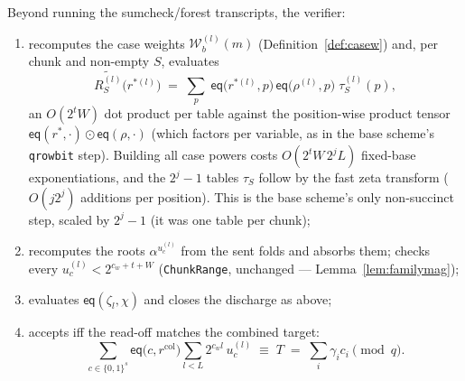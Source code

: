 \documentclass[11pt]{article}
\newcommand{\bits}{\{0,1\}}
\newcommand{\mle}[1]{\widetilde{#1}}
\newcommand{\eq}{\mathsf{eq}}
\newcommand{\cw}{c_w}
\newcommand{\Wc}{\mathcal{W}}          %
\DeclareRobustCommand{\code}[1]{{\def\_{\textunderscore\allowbreak}\texttt{#1}}}
\theoremstyle{plain}
\theoremstyle{definition}
\theoremstyle{remark}
\begin{document}
Beyond running the sumcheck/forest transcripts, the verifier:
\begin{enumerate}[leftmargin=1.8em,itemsep=1pt]
\item recomputes the case weights $\Wc^{(l)}_b(m)$ (Definition~\ref{def:casew})
  and, per chunk and non-empty $S$, evaluates
  \[
    \mle{R^{(l)}_S}\bigl(r^{*(l)}\bigr)
    \;=\; \sum_{p}\;\eq\bigl(r^{*(l)},p\bigr)\,\eq\bigl(\rho^{(l)},p\bigr)\;
          \tau^{(l)}_S(p),
  \]
  an $O(2^{t}W)$ dot product per table against the position-wise product
  tensor $\eq(r^{*},\cdot)\odot\eq(\rho,\cdot)$ (which factors per variable,
  as in the base scheme's \code{q\_rowbit} step). Building all case powers
  costs $O(2^{t}W\,2^{j}L)$ fixed-base exponentiations, and the
  $2^{j}-1$ tables $\tau_S$ follow by the fast zeta transform
  ($O(j2^{j})$ additions per position). This is the base scheme's only
  non-succinct step, scaled by $2^{j}-1$ (it was one table per chunk);
\item recomputes the roots $\alpha^{u^{(l)}_c}$ from the sent folds and
  absorbs them; checks every $u^{(l)}_c < 2^{\cw+t+W}$ (\code{ChunkRange},
  unchanged --- Lemma~\ref{lem:familymag});
\item evaluates $\eq(\zeta_l,\chi)$ and closes the discharge as above;
\item accepts iff the read-off matches the combined target:
  \begin{equation}\label{eq:familyreadoff}
    \sum_{c\in\bits^{s}}\eq\bigl(c,r^{\mathrm{col}}\bigr)
       \sum_{l<L}2^{\cw l}\,u^{(l)}_c
    \;\equiv\; T \;=\;\sum_i\gamma_i c_i \pmod q .
  \end{equation}
\end{enumerate}
\end{document}
